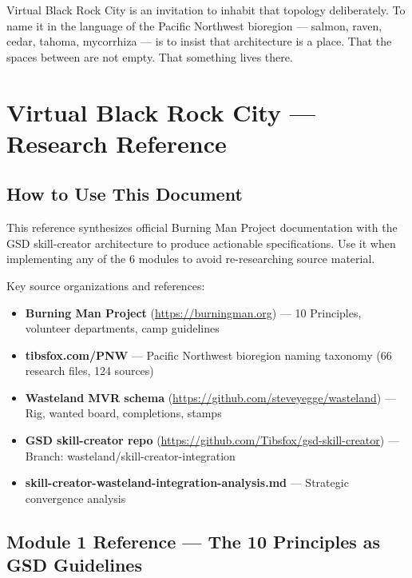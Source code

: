 \documentclass[11pt,letterpaper]{article}
\newcommand{\stageheader}[2]{%
  \noindent\colorbox{#2}{\makebox[\textwidth][l]{%
    \textcolor{white}{\bfseries\sffamily\hspace{6pt}#1\hspace{6pt}}}}%
  \vspace{0.5em}\par%
}
\begin{document}
Virtual Black Rock City is an invitation to inhabit that topology deliberately. To name it in the language of the Pacific Northwest bioregion --- salmon, raven, cedar, tahoma, mycorrhiza --- is to insist that architecture is a place. That the spaces between are not empty. That something lives there.

\newpage

\stageheader{STAGE 2 --- RESEARCH REFERENCE}{secondary}

\section{Virtual Black Rock City --- Research Reference}

\subsection{How to Use This Document}
This reference synthesizes official Burning Man Project documentation with the GSD skill-creator architecture to produce actionable specifications. Use it when implementing any of the 6 modules to avoid re-researching source material.

Key source organizations and references:
\begin{itemize}[noitemsep]
  \item \textbf{Burning Man Project} (\url{https://burningman.org}) --- 10 Principles, volunteer departments, camp guidelines
  \item \textbf{tibsfox.com/PNW} --- Pacific Northwest bioregion naming taxonomy (66 research files, 124 sources)
  \item \textbf{Wasteland MVR schema} (\url{https://github.com/steveyegge/wasteland}) --- Rig, wanted board, completions, stamps
  \item \textbf{GSD skill-creator repo} (\url{https://github.com/Tibsfox/gsd-skill-creator}) --- Branch: wasteland/skill-creator-integration
  \item \textbf{skill-creator-wasteland-integration-analysis.md} --- Strategic convergence analysis
\end{itemize}

\subsection{Module 1 Reference --- The 10 Principles as GSD Guidelines}
\end{document}
